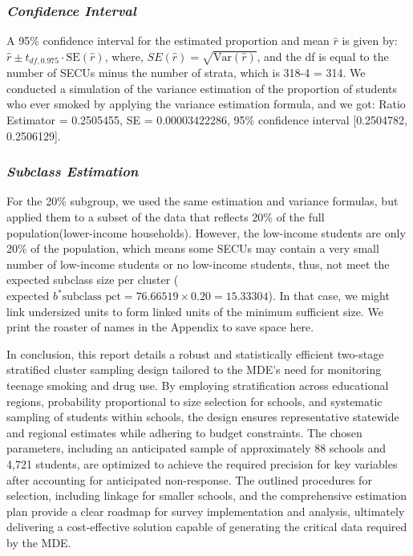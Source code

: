 \documentclass[
  12pt]{article}
\begin{document}
\subsubsection{\texorpdfstring{\emph{Confidence
Interval}}{Confidence Interval}}\label{confidence-interval}

A 95\% confidence interval for the estimated proportion and mean
\(\hat{r}\) is given by:
\(\hat{r} \pm t_{df, 0.975} \cdot \text{SE}(\hat{r})\), where,
\(SE(\hat{r}) = \sqrt{\text{Var}(\hat{r})}\), and the df is equal to the
number of SECUs minus the number of strata, which is 318-4 = 314. We
conducted a simulation of the variance estimation of the proportion of
students who ever smoked by applying the variance estimation formula,
and we got: Ratio Estimator = 0.2505455, SE = 0.00003422286, 95\%
confidence interval {[}0.2504782, 0.2506129{]}.

\subsubsection{\texorpdfstring{\emph{Subclass
Estimation}}{Subclass Estimation}}\label{subclass-estimation}

For the 20\% subgroup, we used the same estimation and variance
formulas, but applied them to a subset of the data that reflects 20\% of
the full population(lower-income households). However, the low-income
students are only 20\% of the population, which means some SECUs may
contain a very small number of low-income students or no low-income
students, thus, not meet the expected subclass size per cluster (
\(\text{expected }b^* \text{subclass pct} = 76.66519 \times 0.20 = 15.33304\)).
In that case, we might link undersized units to form linked units of the
minimum sufficient size. We print the roaster of names in the Appendix
to save space here.

In conclusion, this report details a robust and statistically efficient
two-stage stratified cluster sampling design tailored to the MDE's need
for monitoring teenage smoking and drug use. By employing stratification
across educational regions, probability proportional to size selection
for schools, and systematic sampling of students within schools, the
design ensures representative statewide and regional estimates while
adhering to budget constraints. The chosen parameters, including an
anticipated sample of approximately 88 schools and 4,721 students, are
optimized to achieve the required precision for key variables after
accounting for anticipated non-response. The outlined procedures for
selection, including linkage for smaller schools, and the comprehensive
estimation plan provide a clear roadmap for survey implementation and
analysis, ultimately delivering a cost-effective solution capable of
generating the critical data required by the MDE.
\end{document}
